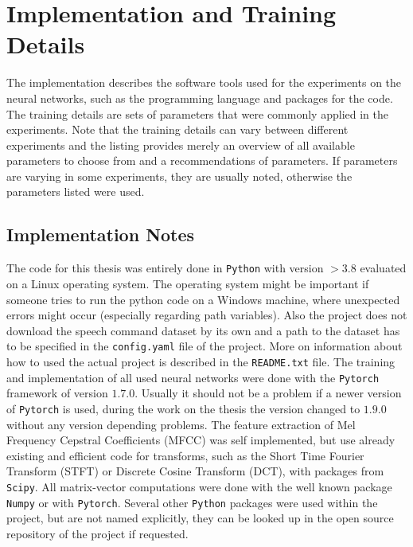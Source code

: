 
\section{Implementation and Training Details}\label{sec:exp_details}
\thesisStateNotReady
The implementation describes the software tools used for the experiments on the neural networks, such as the programming language and packages for the code.
The training details are sets of parameters that were commonly applied in the experiments.
Note that the training details can vary between different experiments and the listing provides merely an overview of all available parameters to choose from and a recommendations of parameters. 
If parameters are varying in some experiments, they are usually noted, otherwise the parameters listed were used.



\subsection{Implementation Notes}\label{sec:exp_details_implementation}
The code for this thesis was entirely done in \texttt{Python} with version $>3.8$ evaluated on a Linux operating system.
The operating system might be important if someone tries to run the python code on a Windows machine, where unexpected errors might occur (especially regarding path variables).
Also the project does not download the speech command dataset by its own and a path to the dataset has to be specified in the \texttt{config.yaml} file of the project.
More on information about how to used the actual project is described in the \texttt{README.txt} file.
The training and implementation of all used neural networks were done with the \texttt{Pytorch} \cite{Pytorch} framework of version $1.7.0$. 
Usually it should not be a problem if a newer version of \texttt{Pytorch} is used, during the work on the thesis the version changed to $1.9.0$ without any version depending problems.
The feature extraction of Mel Frequency Cepstral Coefficients (MFCC) was self implemented, but use already existing and efficient code for transforms, such as the Short Time Fourier Transform (STFT) or Discrete Cosine Transform (DCT), with packages from \texttt{Scipy}.
All matrix-vector computations were done with the well known package \texttt{Numpy} or with \texttt{Pytorch}.
Several other \texttt{Python} packages were used within the project, but are not named explicitly, they can be looked up in the open source repository of the project if requested.


